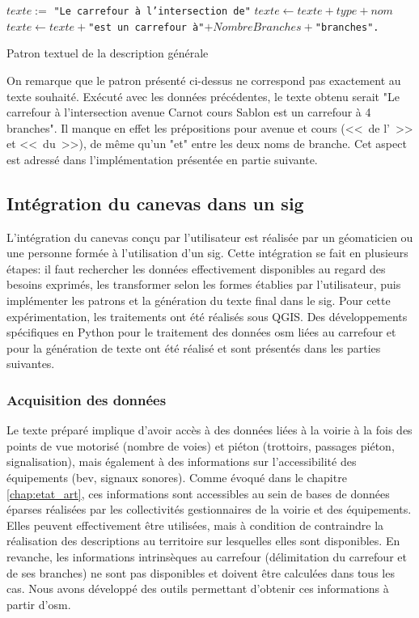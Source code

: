 \begin{algorithm}
\begin{algorithmic}
    \State $texte:=$ \texttt{"Le carrefour à l'intersection de"}
        \State $texte \leftarrow texte + type + nom$
    \EndFor
    \State $texte \leftarrow texte +$\texttt{"est un carrefour à"}$+ NombreBranches+$\texttt{"branches".}
\end{algorithmic}
\caption{Patron textuel de la description générale}
\label{alg:experimentation_patron_generale}
\end{algorithm}

On remarque que le patron présenté ci-dessus ne correspond pas exactement au texte souhaité. Exécuté avec les données précédentes, le texte obtenu serait "Le carrefour à l'intersection avenue Carnot cours Sablon est un carrefour à 4 branches". Il manque en effet les prépositions pour avenue et cours (<<~de l'~>> et <<~du~>>), de même qu'un "et" entre les deux noms de branche. Cet aspect est adressé dans l'implémentation présentée en partie suivante.

\subsection{Intégration du canevas dans un \gls{sig}}

L'intégration du canevas conçu par l'utilisateur est réalisée par un géomaticien ou une personne formée à l'utilisation d'un \gls{sig}. Cette intégration se fait en plusieurs étapes: il faut rechercher les données effectivement disponibles au regard des besoins exprimés, les transformer selon les formes établies par l'utilisateur, puis implémenter les patrons et la génération du texte final dans le \gls{sig}. Pour cette expérimentation, les traitements ont été réalisés sous QGIS. Des développements spécifiques en Python pour le traitement des données \gls{osm} liées au carrefour et pour la génération de texte ont été réalisé et sont présentés dans les parties suivantes.

\subsubsection{Acquisition des données}

Le texte préparé implique d'avoir accès à des données liées à la voirie à la fois des points de vue motorisé (nombre de voies) et piéton (trottoirs, passages piéton, signalisation), mais également à des informations sur l'accessibilité des équipements (\gls{bev}, signaux sonores). Comme évoqué dans le chapitre \ref{chap:etat_art}, ces informations sont accessibles au sein de bases de données éparses réalisées par les collectivités gestionnaires de la voirie et des équipements. Elles peuvent effectivement être utilisées, mais à condition de contraindre la réalisation des descriptions au territoire sur lesquelles elles sont disponibles. En revanche, les informations intrinsèques au carrefour (délimitation du carrefour et de ses branches) ne sont pas disponibles et doivent être calculées dans tous les cas. Nous avons développé des outils permettant d'obtenir ces informations à partir d'\gls{osm}.

